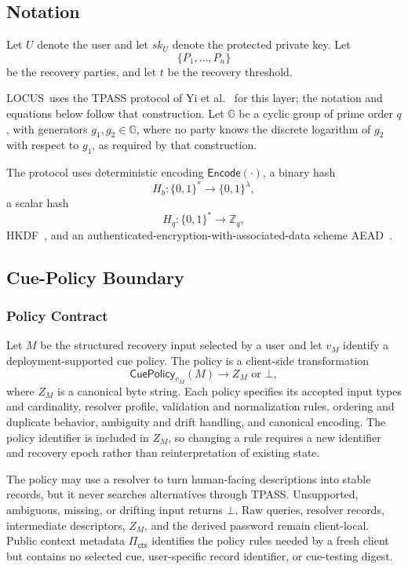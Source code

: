 \documentclass[sigconf,anonymous]{acmart}
\newcounter{protocol}
\newcommand{\LOCUS}{\textsf{LOCUS}}
\newcommand{\Encode}{\mathsf{Encode}}
\begin{document}

\subsection{Notation}

Let \(U\) denote the user and let \(sk_U\) denote the protected private key. Let
\[
\{P_1,\ldots,P_n\}
\]
be the recovery parties, and let \(t\) be the recovery threshold.

\LOCUS\ uses the TPASS protocol of Yi et al.~\cite{Yi2015TPASS,Yi2019TPASS} for this layer; the notation and equations below follow that construction. Let \(\mathbb{G}\) be a cyclic group of prime order \(q\), with generators \(g_1,g_2\in\mathbb{G}\), where no party knows the discrete logarithm of \(g_2\) with respect to \(g_1\), as required by that construction.

The protocol uses deterministic encoding \(\Encode(\cdot)\), a binary hash
\[
H_b:\{0,1\}^{\ast}\rightarrow \{0,1\}^{\lambda},
\]
a scalar hash
\[
H_q:\{0,1\}^{\ast}\rightarrow \mathbb{Z}_q,
\]
HKDF~\cite{HKDF2010}, and an authenticated-encryption-with-associated-data scheme AEAD~\cite{RFC5116AEAD}.

\subsection{Cue-Policy Boundary}
\label{sec:cue-policy}

\subsubsection{Policy Contract}

Let \(M\) be the structured recovery input selected by a user and let \(v_M\)
identify a deployment-supported cue policy. The policy is a client-side
transformation
\[
\mathsf{CuePolicy}_{v_M}(M)
\rightarrow
Z_M \text{ or } \bot,
\]
where \(Z_M\) is a canonical byte string. Each policy specifies its accepted
input types and cardinality, resolver profile, validation and normalization
rules, ordering and duplicate behavior, ambiguity and drift handling, and
canonical encoding. The policy identifier is included in \(Z_M\), so changing a
rule requires a new identifier and recovery epoch rather than reinterpretation
of existing state.

The policy may use a resolver to turn human-facing descriptions into stable
records, but it never searches alternatives through TPASS. Unsupported,
ambiguous, missing, or drifting input returns \(\bot\). Raw queries, resolver
records, intermediate descriptors, \(Z_M\), and the derived password remain
client-local. Public context metadata \(\Pi_{\mathsf{ctx}}\) identifies the
policy rules needed by a fresh client but contains no selected cue,
user-specific record identifier, or cue-testing digest.
\end{document}
